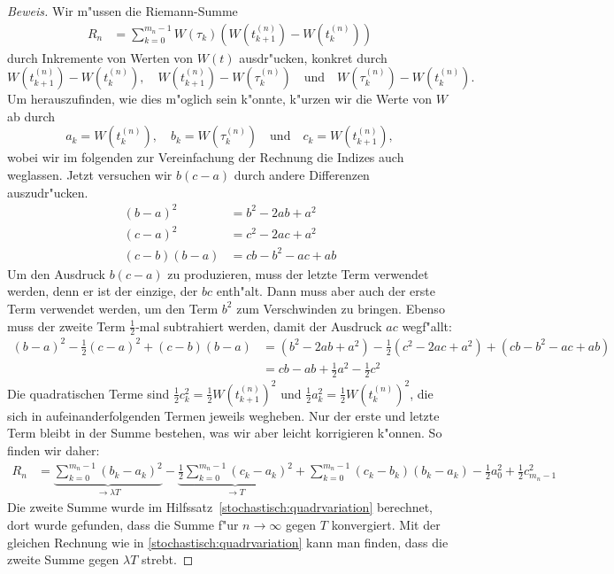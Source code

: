 \begin{proof}[Beweis]
Wir m"ussen die Riemann-Summe
\begin{align*}
R_n
&=
\sum_{k=0}^{m_n-1}
W(\tau_k) (W(t_{k+1}^{(n)})-W(t_k^{(n)}))
\end{align*}
durch Inkremente von Werten von $W(t)$ ausdr"ucken, konkret durch
\[
W(t_{k+1}^{(n)})-W(t_k^{(n)}),\quad
W(t_{k+1}^{(n)})-W(\tau_k^{(n)})
\quad \text{und} \quad
W(\tau_k^{(n)})-W(t_k^{(n)}).
\]
Um herauszufinden, wie dies m"oglich sein k"onnte, k"urzen wir die Werte
von $W$ ab durch
\[
a_k=W(t_k^{(n)}),\quad
b_k=W(\tau_k^{(n)})\quad\text{und}\quad
c_k=W(t_{k+1}^{(n)}),
\]
wobei wir im folgenden zur Vereinfachung der Rechnung die Indizes auch
weglassen.
Jetzt versuchen wir $b(c-a)$ durch andere Differenzen auszudr"ucken.
\begin{align*}
(b-a)^2
&=
b^2-2ab + a^2
\\
(c-a)^2
&=
c^2-2ac+a^2
\\
(c-b)(b-a)
&=
cb-b^2-ac+ab
\end{align*}
Um den Ausdruck $b(c-a)$ zu produzieren, muss der letzte Term verwendet
werden, denn er ist der einzige, der $bc$ enth"alt.
Dann muss aber auch der erste Term verwendet werden, um den Term $b^2$ zum
Verschwinden  zu bringen.
Ebenso muss der zweite Term $\frac12$-mal subtrahiert werden, damit der
Ausdruck $ac$ wegf"allt:
\begin{align*}
(b-a)^2-\frac12(c-a)^2+(c-b)(b-a)
&=
(b^2-2ab + a^2)
-\frac12(c^2-2ac+a^2)
+(cb-b^2-ac+ab)
\\
&=
cb-ab + \frac12a^2
-\frac12c^2
\end{align*}
Die quadratischen Terme sind $\frac12c_k^2=\frac12W(t_{k+1}^{(n)})^2$ und
$\frac12a_k^2=\frac12W(t_{k}^{(n)})^2$, die sich in aufeinanderfolgenden Termen
jeweils wegheben.
Nur der erste und letzte Term bleibt in der Summe bestehen, was wir
aber leicht korrigieren k"onnen.
So finden wir daher:
\begin{align*}
R_n
&=
\underbrace{
\sum_{k=0}^{m_n-1} (b_k-a_k)^2
}_{\textstyle\to\lambda T}
-
\underbrace{
\frac12\sum_{k=0}^{m_n-1} (c_k-a_k)^2
}_{\textstyle\to T}
+\sum_{k=0}^{m_n-1} (c_k-b_k)(b_k-a_k)
- \frac12a_0^2
+ \frac12c_{m_n-1}^2
\end{align*}
Die zweite Summe wurde im Hilfssatz~\ref{stochastisch:quadrvariation}
berechnet, dort wurde gefunden, dass die Summe f"ur $n\to\infty$ gegen $T$
konvergiert.
Mit der gleichen Rechnung wie in \ref{stochastisch:quadrvariation}
kann man finden, dass die zweite Summe gegen $\lambda T$ strebt.


\end{proof}

